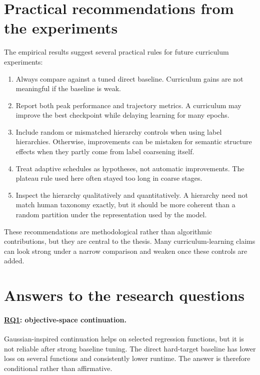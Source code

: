 \documentclass[english,master,a4paper,oneside]{ppfcmthesis}
\begin{document}
\section{Practical recommendations from the experiments}

The empirical results suggest several practical rules for future curriculum
experiments:

\begin{enumerate}
    \item Always compare against a tuned direct baseline. Curriculum gains are
          not meaningful if the baseline is weak.
    \item Report both peak performance and trajectory metrics. A curriculum may
          improve the best checkpoint while delaying learning for many epochs.
    \item Include random or mismatched hierarchy controls when using label
          hierarchies. Otherwise, improvements can be mistaken for semantic
          structure effects when they partly come from label coarsening itself.
    \item Treat adaptive schedules as hypotheses, not automatic improvements.
          The plateau rule used here often stayed too long in coarse stages.
    \item Inspect the hierarchy qualitatively and quantitatively. A hierarchy
          need not match human taxonomy exactly, but it should be more coherent
          than a random partition under the representation used by the model.
\end{enumerate}

These recommendations are methodological rather than algorithmic contributions,
but they are central to the thesis. Many curriculum-learning claims can look
strong under a narrow comparison and weaken once these controls are added.

\section{Answers to the research questions}

\paragraph{\hyperref[rq:continuation]{RQ1}: objective-space continuation.}
Gaussian-inspired continuation helps on selected regression functions, but it is
not reliable after strong baseline tuning. The direct hard-target baseline has
lower loss on several functions and consistently lower runtime. The answer is therefore
conditional rather than affirmative.
\end{document}
